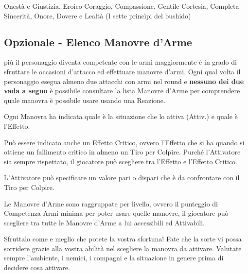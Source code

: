 \begin{multicols}{2}
\begin{changemargin}{0.3cm}{0.3cm}\begin{enfasi}{
			Onestà e Giustizia, Eroico Coraggio, Compassione, Gentile Cortesia, Completa Sincerità, Onore, Dovere e Lealtà (I sette princìpi del bushido)
}\end{enfasi}\end{changemargin}

\subsection{Opzionale - Elenco Manovre d'Arme}\hypertarget{elencotalentiarmi}{}\label{elencotalentiarmi}

più il personaggio diventa competente con le armi maggiormente è in grado di sfruttare le occasioni d'attacco ed effettuare manovre d'armi. Ogni qual volta il personaggio esegua almeno due attacchi con armi nel round e \textbf{nessuno dei due vada a segno} è possibile consultare la lista Manovre d'Arme per comprendere quale manovra è possibile usare usando una Reazione.

Ogni Manovra ha indicata quale è la situazione che lo attiva (Attiv.) e quale è l'Effetto.

Può essere indicato anche un Effetto Critico, ovvero l'Effetto che si ha quando si ottiene un fallimento critico in almeno un Tiro per Colpire. Purché l'Attivatore sia sempre rispettato, il giocatore può scegliere tra l'Effetto e l'Effetto Critico.

L'Attivatore può specificare un valore pari o dispari che è da confrontare con il Tiro per Colpire.

Le Manovre d'Arme sono raggruppate per livello, ovvero il punteggio di Competenza Armi minima per poter usare quelle manovre, il giocatore può scegliere tra tutte le Manovre d'Arme a lui accessibili ed Attivabili.

\begin{changemargin}{0.3cm}{0.3cm}\begin{tcolorbox}[title = Ho mancato!]
		Sfruttalo come e meglio che potete la vostra sfortuna! Fate che la sorte vi possa sorridere grazie alla vostra abilità nel scegliere la manovra da attivare. Valutate sempre l'ambiente, i nemici, i compagni e la situazione in genere prima di decidere cosa attivare.
\end{tcolorbox}\end{changemargin}

\begin{itemize}[leftmargin=*]
	\setlength{\itemsep}{0pt}
	

\end{itemize}
\end{multicols}
